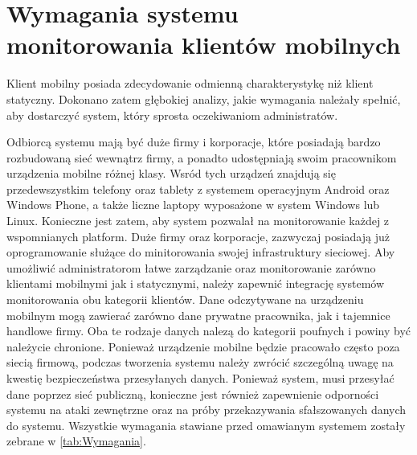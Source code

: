 \section[Wymagania][Wymagania systemu monitorowania klientów
mobilnych]{Wymagania systemu monitorowania klientów mobilnych}

Klient mobilny posiada zdecydowanie odmienną charakterystykę niż
klient statyczny. Dokonano zatem głębokiej analizy, jakie wymagania
należały spełnić, aby dostarczyć system, który sprosta oczekiwaniom
administratów.

Odbiorcą systemu mają być duże firmy i korporacje, które posiadają
bardzo rozbudowaną sieć wewnątrz firmy, a ponadto udostępniają swoim
pracownikom urządzenia mobilne różnej klasy. Wsród tych urządzeń
znajdują się przedewszystkim telefony oraz tablety z systemem
operacyjnym Android oraz Windows Phone, a także liczne laptopy
wyposażone w system Windows lub Linux. Konieczne jest zatem, aby
system pozwalał na monitorowanie każdej z wspomnianych platform. Duże
firmy oraz korporacje, zazwyczaj posiadają już oprogramowanie służące
do minitorowania swojej infrastruktury sieciowej. Aby umożliwić
administratorom łatwe zarządzanie oraz monitorowanie zarówno klientami
mobilnymi jak i statycznymi, należy zapewnić integrację systemów
monitorowania obu kategorii klientów. Dane odczytywane na urządzeniu
mobilnym mogą zawierać zarówno dane prywatne pracownika, jak i
tajemnice handlowe firmy. Oba te rodzaje danych nalezą do kategorii
poufnych i powiny być należycie chronione. Ponieważ urządzenie mobilne
będzie pracowało często poza siecią firmową, podczas tworzenia systemu
należy zwrócić szczególną uwagę na kwestię bezpieczeństwa przesyłanych
danych. Ponieważ system, musi przesyłać dane poprzez sieć publiczną,
konieczne jest również zapewnienie odporności systemu na ataki
zewnętrzne oraz na próby przekazywania sfałszowanych danych do
systemu. Wszystkie wymagania stawiane przed omawianym systemem zostały zebrane w \ref{tab:Wymagania}.

